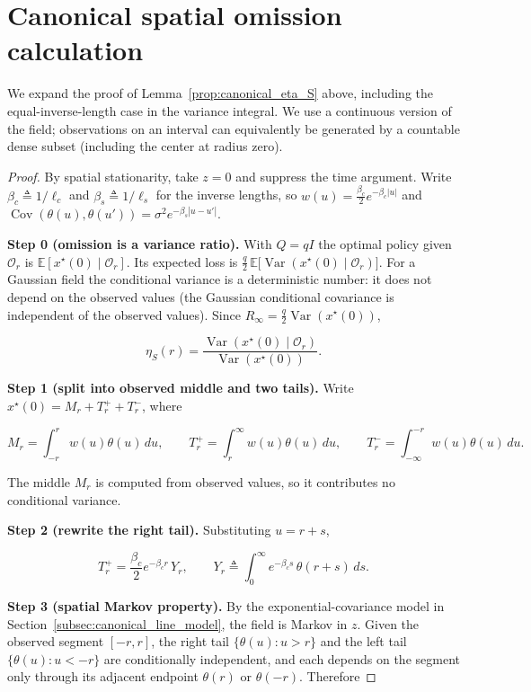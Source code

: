 \section{Canonical spatial omission calculation}
\label{app:technical-canonical}
We expand the proof of Lemma~\ref{prop:canonical_eta_S} above,
including the equal-inverse-length case in the variance integral.
We use a continuous version of the field; observations on an interval can
equivalently be generated by a countable dense subset (including the center
at radius zero).
\begin{proof}
By spatial stationarity, take $z=0$ and suppress the time argument. Write $\beta_c\triangleq1/\ell_c$ and $\beta_s\triangleq1/\ell_s$ for the inverse lengths, so $w(u)=\tfrac{\beta_c}{2}e^{-\beta_c|u|}$ and $\operatorname{Cov}(\theta(u),\theta(u'))=\sigma^2e^{-\beta_s|u-u'|}$.

\textbf{Step 0 (omission is a variance ratio).} With $Q=qI$ the optimal policy given $\mathcal O_r$ is $\mathbb E[x^\star(0)\mid\mathcal O_r]$. Its expected loss is $\tfrac q2\,\mathbb E\big[\operatorname{Var}(x^\star(0)\mid\mathcal O_r)\big]$. For a Gaussian field the conditional variance is a deterministic number: it does not depend on the observed values (the Gaussian conditional covariance is independent of the observed values). Since $R_\infty=\tfrac q2\operatorname{Var}(x^\star(0))$,

\[
\eta_S(r)=\frac{\operatorname{Var}(x^\star(0)\mid\mathcal O_r)}{\operatorname{Var}(x^\star(0))}.
\]

\textbf{Step 1 (split into observed middle and two tails).} Write $x^\star(0)=M_r+T_r^++T_r^-$, where

\[
M_r=\int_{-r}^{r}w(u)\theta(u)\,du,\qquad T_r^+=\int_r^\infty w(u)\theta(u)\,du,\qquad T_r^-=\int_{-\infty}^{-r}w(u)\theta(u)\,du .
\]

The middle $M_r$ is computed from observed values, so it contributes no conditional variance.

\textbf{Step 2 (rewrite the right tail).} Substituting $u=r+s$,

\[
T_r^+=\frac{\beta_c}{2}e^{-\beta_c r}\,Y_r,\qquad Y_r\triangleq\int_0^\infty e^{-\beta_c s}\,\theta(r+s)\,ds .
\]

\textbf{Step 3 (spatial Markov property).} By the exponential-covariance model in Section~\ref{subsec:canonical_line_model}, the field is Markov in $z$. Given the observed segment $[-r,r]$, the right tail $\{\theta(u):u>r\}$ and the left tail $\{\theta(u):u<-r\}$ are conditionally independent, and each depends on the segment only through its adjacent endpoint $\theta(r)$ or $\theta(-r)$. Therefore


\end{proof}

